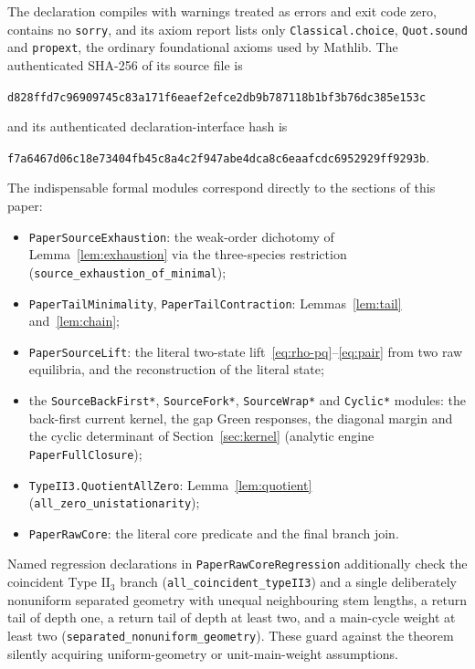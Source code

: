 \documentclass[11pt,reqno]{amsart}
\theoremstyle{plain}
\theoremstyle{definition}
\theoremstyle{remark}
\numberwithin{equation}{section}
\begin{document}
The declaration compiles with warnings treated as errors and exit code zero, contains no \texttt{sorry}, and its axiom report lists only \texttt{Classical.choice}, \texttt{Quot.sound} and \texttt{propext}, the ordinary foundational axioms used by Mathlib.  The authenticated SHA-256 of its source file is
\begin{center}\small\texttt{d828ffd7c96909745c83a171f6eaef2efce2db9b787118b1bf3b76dc385e153c}\end{center}
and its authenticated declaration-interface hash is
\begin{center}\small\texttt{f7a6467d06c18e73404fb45c8a4c2f947abe4dca8c6eaafcdc6952929ff9293b}.\end{center}

The indispensable formal modules correspond directly to the sections of this paper:
\begin{itemize}[nosep]
\item \texttt{PaperSourceExhaustion}: the weak-order dichotomy of Lemma~\ref{lem:exhaustion} via the three-species restriction (\texttt{source\_exhaustion\_of\_minimal});
\item \texttt{PaperTailMinimality}, \texttt{PaperTailContraction}: Lemmas~\ref{lem:tail} and~\ref{lem:chain};
\item \texttt{PaperSourceLift}: the literal two-state lift~\eqref{eq:rho-pq}--\eqref{eq:pair} from two raw equilibria, and the reconstruction of the literal state;
\item the \texttt{SourceBackFirst*}, \texttt{SourceFork*}, \texttt{SourceWrap*} and \texttt{Cyclic*} modules: the back-first current kernel, the gap Green responses, the diagonal margin and the cyclic determinant of Section~\ref{sec:kernel} (analytic engine \texttt{PaperFullClosure});
\item \texttt{TypeII3.QuotientAllZero}: Lemma~\ref{lem:quotient} (\texttt{all\_zero\_unistationarity});
\item \texttt{PaperRawCore}: the literal core predicate and the final branch join.
\end{itemize}
Named regression declarations in \texttt{PaperRawCoreRegression} additionally check the coincident Type $\mathrm{II}_3$ branch (\texttt{all\_coincident\_typeII3}) and a single deliberately nonuniform separated geometry with unequal neighbouring stem lengths, a return tail of depth one, a return tail of depth at least two, and a main-cycle weight at least two (\texttt{separated\_nonuniform\_geometry}).  These guard against the theorem silently acquiring uniform-geometry or unit-main-weight assumptions.
\end{document}
